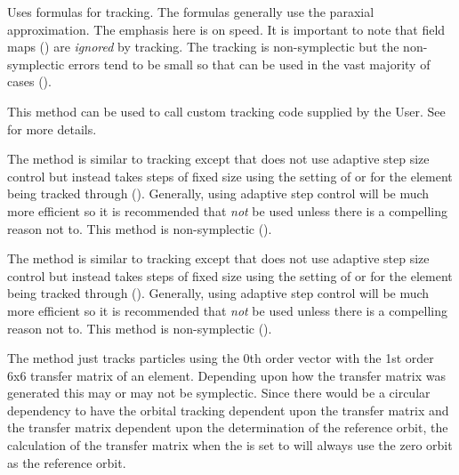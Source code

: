\begin{description}

\item[\vn{Bmad_Standard}]
Uses formulas for tracking. The formulas generally use the paraxial approximation. The emphasis here
is on speed. It is important to note that field maps () are {\em ignored} by
 tracking. The tracking is non-symplectic but the non-symplectic errors tend to
be small so that  can be used in the vast majority of cases ().

\item[\vn{Custom}]
This method can be used to call custom tracking code supplied by the User. See 
for more details.

\item[\vn{fixed_step_runge_kutta}]
The  method is similar to  tracking except that
 does not use adaptive step size control but instead takes steps of fixed
size using the setting of  or  for the element being tracked through
().  Generally, using adaptive step control will be much more efficient so it is
recommended that  {\em not} be used unless there is a compelling reason
not to. This method is non-symplectic ().

\item[\vn{fixed_step_time_runge_kutta}]
The  method is similar to  tracking except that
 does not use adaptive step size control but instead takes steps of
fixed size using the setting of  or  for the element being tracked through
().  Generally, using adaptive step control will be much more efficient so it is
recommended that  {\em not} be used unless there is a compelling
reason not to. This method is non-symplectic ().

\item[\vn{Linear}]
The  method just tracks particles using the 0th order vector with the 1st order 6x6
transfer matrix of an element. Depending upon how the transfer matrix was generated this may or may
not be symplectic. Since there would be a circular dependency to have the orbital tracking dependent
upon the transfer matrix and the transfer matrix dependent upon the determination of the reference
orbit, the calculation of the transfer matrix when the  is set to 
will always use the zero orbit as the reference orbit.


\end{description}
